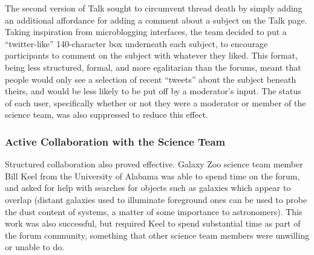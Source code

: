 \documentclass{sigchi}
\begin{document}
The second version of Talk sought to circumvent thread death by simply adding an additional affordance for adding a comment about a subject on the Talk page.  Taking inspiration from microblogging interfaces, the team decided to put a ``twitter-like'' 140-character box underneath each subject, to encourage participants to comment on the subject with whatever they liked.  This format, being less structured, formal, and more egalitarian than the forums, meant that people would only see a selection of recent ``tweets'' about the subject beneath theirs, and would be less likely to be put off by a moderator's input.  The status of each user, specifically whether or not they were a moderator or member of the science team, was also suppressed to reduce this effect.    


\subsubsection{Active Collaboration with the Science Team}
Structured collaboration also proved effective. Galaxy Zoo science team member Bill Keel from the University of Alabama was able to spend time on the forum, and asked for help with searches for objects such as galaxies which appear to overlap \cite{overlap} (distant galaxies used to illuminate foreground ones can be used to probe the dust content of systems, a matter of some importance to astronomers). This work was also successful, but required Keel to spend substantial time as part of the forum community, something that other science team members were unwilling or unable to do. 

\end{document}
